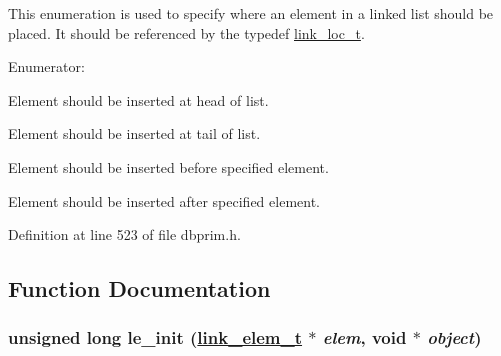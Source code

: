 This enumeration is used to specify where an element in a linked list should be placed. It should be referenced by the typedef \hyperlink{group__dbprim__link_ga4}{link\_\-loc\_\-t}.\begin{Desc}
\item[Enumerator: ]\par
\begin{description}
\item[{\em 
\hypertarget{group__dbprim__link_gga28a133}{
LINK\_\-LOC\_\-HEAD}
\label{group__dbprim__link_gga28a133}
}]Element should be inserted at head of list. \item[{\em 
\hypertarget{group__dbprim__link_gga28a134}{
LINK\_\-LOC\_\-TAIL}
\label{group__dbprim__link_gga28a134}
}]Element should be inserted at tail of list. \item[{\em 
\hypertarget{group__dbprim__link_gga28a135}{
LINK\_\-LOC\_\-BEFORE}
\label{group__dbprim__link_gga28a135}
}]Element should be inserted before specified element. \item[{\em 
\hypertarget{group__dbprim__link_gga28a136}{
LINK\_\-LOC\_\-AFTER}
\label{group__dbprim__link_gga28a136}
}]Element should be inserted after specified element. \end{description}
\end{Desc}



Definition at line 523 of file dbprim.h.

\subsection{Function Documentation}
\hypertarget{group__dbprim__link_ga12}{
\subsubsection[le\_\-init]{\setlength{\rightskip}{0pt plus 5cm}unsigned long le\_\-init (\hyperlink{struct__link__elem__s}{link\_\-elem\_\-t} $\ast$ {\em elem}, void $\ast$ {\em object})}}
\label{group__dbprim__link_ga12}


